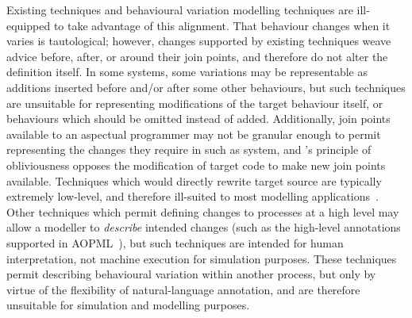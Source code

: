 Existing \aspectorientation{} techniques and behavioural variation modelling
techniques are ill-equipped to take advantage of this alignment. That behaviour
changes when it varies is tautological; however, changes supported by existing
\aspectorientation{} techniques weave advice before, after, or around their join
points, and therefore do not alter the definition itself. In some systems, some
variations may be representable as additions inserted before and/or after some
other behaviours, but such techniques are unsuitable for representing
modifications of the target behaviour itself, or behaviours which should be
omitted instead of added. Additionally, join points available to an aspectual
programmer may not be granular enough to permit representing the changes they
require in such as system, and \aspectorientation{}'s principle of obliviousness
opposes the modification of target code to make new join points available.
Techniques which would directly rewrite target source are typically extremely
low-level, and therefore ill-suited to most modelling
applications~\cite{keller1998binary}. Other techniques which permit defining
changes to processes at a high level may allow a modeller to \emph{describe}
intended changes (such as the high-level annotations supported in
AOPML~\cite{Cappelli_AOBPM}), but such techniques are intended for human
interpretation, not machine execution for simulation purposes. These techniques
permit describing behavioural variation within another process, but only by
virtue of the flexibility of natural-language annotation, and are therefore
unsuitable for simulation and modelling purposes.

